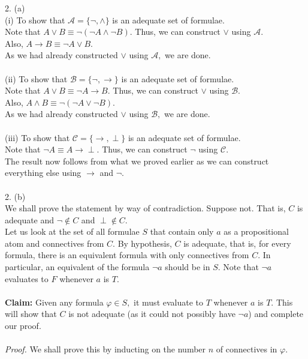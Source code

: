 \documentclass{article}
\begin{document}
2. (a)\\
(i) To show that $\mathcal{A} = \{\neg, \wedge\}$ is an adequate set of formulae. \\
Note that $A\vee B \equiv \neg(\neg A \wedge \neg B).$ Thus, we can construct $\vee$ using $\mathcal{A}.$ \\
Also, $A \to B \equiv \neg A \vee B.$ \\
As we had already constructed $\vee$ using $\mathcal{A},$ we are done.\\~\\
(ii) To show that $\mathcal{B} = \{\neg, \to\}$ is an adequate set of formulae.\\
Note that $A\vee B \equiv \neg A \to B.$ Thus, we can construct $\vee$ using $\mathcal{B}.$ \\
Also, $A \wedge B\equiv \neg(\neg A\vee \neg B).$ \\
As we had already constructed $\vee$ using $\mathcal{B},$ we are done.\\~\\
(iii) To show that $\mathcal{C} = \{\to, \perp\}$ is an adequate set of formulae.\\
Note that $\neg A \equiv A \to \perp.$ Thus, we can construct $\neg$ using $\mathcal{C}.$\\
The result now follows from what we proved earlier as we can construct everything else using $\to$ and $\neg.$ \\~\\
%
2. (b)\\
We shall prove the statement by way of contradiction. Suppose not. That is, $C$ is adequate and $\neg \not\in C$ and $\perp\not\in C.$\\
Let us look at the set of all formulae $S$ that contain only $a$ as a propositional atom and connectives from $C.$ By hypothesis, $C$ is adequate, that is, for every formula, there is an equivalent formula with only connectives from $C.$ In particular, an equivalent of the formula $\neg a$ should be in $S.$ Note that $\neg a$ evaluates to $F$ whenever $a$ is $T.$\\~\\
\textbf{Claim:} Given any formula $\varphi \in S,$ it must evaluate to $T$ whenever $a$ is $T.$ This will show that $C$ is not adequate (as it could not possibly have $\neg a$) and complete our proof.\\~\\
\emph{Proof.} We shall prove this by inducting on the number $n$ of connectives in $\varphi.$\\
\end{document}
